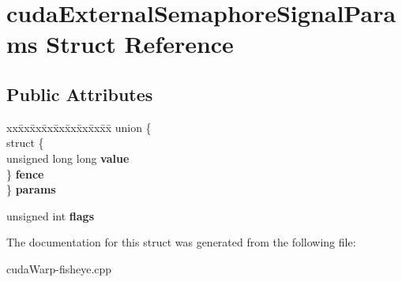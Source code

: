 \hypertarget{structcudaExternalSemaphoreSignalParams}{}\section{cuda\+External\+Semaphore\+Signal\+Params Struct Reference}
\label{structcudaExternalSemaphoreSignalParams}
\subsection*{Public Attributes}
\begin{DoxyCompactItemize}
\item 
\begin{tabbing}
xx\=xx\=xx\=xx\=xx\=xx\=xx\=xx\=xx\=\kill
union \{\\
\>struct \{\\
\>\>unsigned long long {\bfseries value}\\
\>\} {\bfseries fence}\\
\} {\bfseries params}\hypertarget{structcudaExternalSemaphoreSignalParams_aea18bc9bee3f3e9dbfcc89400ccd582d}{}\label{structcudaExternalSemaphoreSignalParams_aea18bc9bee3f3e9dbfcc89400ccd582d}
\\

\end{tabbing}\item 
unsigned int {\bfseries flags}\hypertarget{structcudaExternalSemaphoreSignalParams_af45327d7eafb4fc6e356bcef1a166b83}{}\label{structcudaExternalSemaphoreSignalParams_af45327d7eafb4fc6e356bcef1a166b83}

\end{DoxyCompactItemize}


The documentation for this struct was generated from the following file\+:\begin{DoxyCompactItemize}
\item 
cuda\+Warp-\/fisheye.\+cpp\end{DoxyCompactItemize}
